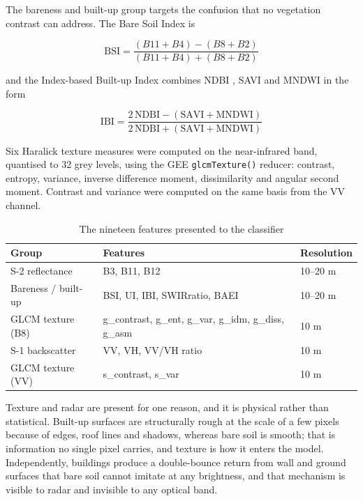 \documentclass[conference]{IEEEtran}
\begin{document}
The bareness and built-up group targets the confusion that no vegetation
contrast can address. The Bare Soil Index \cite{ref26} is

\begin{equation}
\mathrm{BSI} = \frac{(B11 + B4) - (B8 + B2)}{(B11 + B4) + (B8 + B2)}
\end{equation}

and the Index-based Built-up Index \cite{ref27} combines NDBI
\cite{ref24}, SAVI \cite{ref28} and MNDWI \cite{ref25} in the form

\begin{equation}
\mathrm{IBI} = \frac{2\,\mathrm{NDBI} - (\mathrm{SAVI} + \mathrm{MNDWI})}
                    {2\,\mathrm{NDBI} + (\mathrm{SAVI} + \mathrm{MNDWI})}
\end{equation}

Six Haralick texture measures \cite{ref23} were computed on the
near-infrared band, quantised to 32 grey levels, using the GEE
\texttt{glcmTexture()} reducer: contrast, entropy, variance, inverse
difference moment, dissimilarity and angular second moment. Contrast and
variance were computed on the same basis from the VV channel.

\begin{table}[!t]
\caption{The nineteen features presented to the classifier}
\label{tab:bands}
\centering
\footnotesize
\begin{tabular}{@{}p{19mm}p{36mm}p{13mm}@{}}
\toprule
\textbf{Group} & \textbf{Features} & \textbf{Resolution} \\
\midrule
S-2 reflectance & B3, B11, B12 & 10--20 m \\
Bareness / built-up & BSI, UI, IBI, SWIRratio, BAEI & 10--20 m \\
GLCM texture (B8) & g\_contrast, g\_ent, g\_var, g\_idm, g\_diss, g\_asm & 10 m \\
S-1 backscatter & VV, VH, VV/VH ratio & 10 m \\
GLCM texture (VV) & s\_contrast, s\_var & 10 m \\
\bottomrule
\end{tabular}
\end{table}

Texture and radar are present for one reason, and it is physical rather
than statistical. Built-up surfaces are structurally rough at the scale
of a few pixels because of edges, roof lines and shadows, whereas bare
soil is smooth; that is information no single pixel carries, and texture
is how it enters the model. Independently, buildings produce a
double-bounce return from wall and ground surfaces that bare soil cannot
imitate at any brightness, and that mechanism is visible to radar and
invisible to any optical band.
\end{document}

